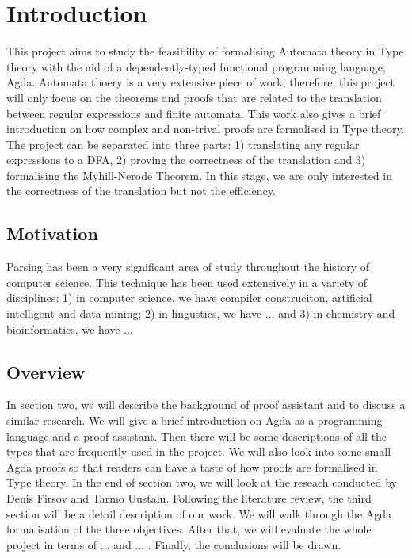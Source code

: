 \documentclass[twoside,openright,final]{bhamthesis}
\begin{document}
\section{Introduction}
\par This project aims to study the feasibility of formalising
Automata theory in Type theory with the aid of a dependently-typed
functional programming language, Agda. Automata thoery is a very
extensive piece of work; therefore, this project will only focus on the theorems and
proofs that are related to the translation between regular expressions
and finite automata. This work also gives a brief introduction
on how complex and non-trival proofs are formalised in Type
theory. The project can be separated into three parts: 1) translating any regular expressions to
a DFA, 2) proving the correctness of the translation and 3)
formalising the Myhill-Nerode Theorem. In this stage, we are only
interested in the correctness of the translation but not the
efficiency. 

\subsection{Motivation}
\par Parsing has been a very significant area of study throughout the
history of computer science. This technique has been used extensively
in a variety of disciplines: 1) in computer science, we have
compiler construciton, artificial intelligent and data mining; 2) in
lingustics, we have ... and 3) in chemistry and bioinformatics, we have ...

\subsection{Overview}
\par In section two, we will describe the background of proof assistant
and to discuss a similar research. We will give a brief introduction on
Agda as a programming language and a proof assistant. Then there will
be some descriptions of all the types that are frequently used in the project. We
will also look into some small Agda proofs so that readers can
have a taste of how proofs are formalised in Type
theory. In the end of section two, we will look at the reseach
\cite{Firsov2013} conducted by Denis Firsov and Tarmo Uustalu. Following the
literature review, the third section will
be a detail description of our work. We will walk through the Agda
formalisation of the three objectives. After that, we will evaluate
the whole project in terms of ... and ... . Finally, the conclusions will be
drawn. 
\end{document}
